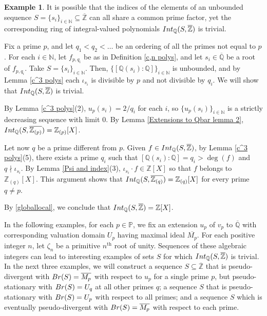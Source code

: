 \documentclass{article}
\theoremstyle{definition}\newtheorem{Def}[equation]{Definition}
\newtheorem{Ex}[equation]{Example}
\theoremstyle{definition}\newtheorem{Ques}[equation]{Question}
\theoremstyle{definition}\newtheorem{Conj}[equation]{Conjecture}
\theoremstyle{definition}\newtheorem{Not}[equation]{Notation}
\newcommand{\N}{\mathbb{N}}
\newcommand{\Q}{\mathbb{Q}}
\newcommand{\oQ}{\overline{\Q}}
\newcommand{\oZ}{\overline{\Z}}
\newcommand{\Z}{\mathbb{Z}}
\newcommand{\oMp}{\overline{M_p}}
\newcommand{\Int}{\textnormal{Int}}
\newcommand{\IntQ}{\Int_{\Q}}
\newcommand{\Br}{\textnormal{Br}}
\newcommand{\PP}{\mathbb{P}}
\numberwithin{equation}{section}
\begin{document}
\begin{Ex}\label{unbounded trivial example 1}
It is possible that the indices of the elements of an unbounded sequence $S=\{s_i\}_{i\in\N}\subseteq\oZ$ can all share a common prime factor, yet the corresponding ring of integral-valued polynomials $\IntQ(S,\oZ)$ is trivial.

Fix a prime $p$, and let $q_1 < q_2 < \ldots$ be an ordering of all the primes not equal to $p$. For each $i \in \N$, let $f_{p,q_i}$ be as in Definition \ref{c,n polys}, and let $s_i\in\oQ$ be a root of $f_{p,q_i}$. Take $S = \{s_i\}_{i \in \N}$. Then, $\{[\Q(s_i): \Q]\}_{i \in \N}$ is unbounded, and by Lemma \ref{c^3 polys} each $\iota_{s_i}$ is divisible by $p$ and not divisible by $q_i$. We will show that $\IntQ(S,\oZ)$ is trivial.

By Lemma \ref{c^3 polys}(2), $u_p(s_i)=2/q_i$ for each $i$, so $\{u_p(s_i)\}_{i \in \N}$ is a strictly decreasing sequence with limit $0$. By Lemma \ref{Extensions to Qbar lemma 2}, $\IntQ(S, \overline{\Z_{(p)}}) = \Z_{(p)}[X]$.

Let now $q$ be a prime different from $p$. Given  $f\in\IntQ(S,\oZ)$, by Lemma \ref{c^3 polys}(5), there exists a prime $q_i$ such that $[\Q(s_i):\Q]=q_i>\deg(f)$ and $q\nmid\iota_{s_i}$. By Lemma \ref{Psi and index}(3), $\iota_{s_i}\cdot f\in\Z[X]$ so that $f$ belongs to $\Z_{(q)}[X]$. This argument shows that $\IntQ(S,\overline{\Z_{(q)}})=\Z_{(q)}[X]$ for every prime $q\not=p$.

By \eqref{globallocal}, we conclude that $\IntQ(S,\oZ)=\Z[X]$.
\end{Ex}

In the following examples, for each $p\in\PP$, we fix an extension $u_p$ of $v_p$ to $\oQ$ with corresponding valuation domain $U_p$ having maximal ideal $\oMp$. For each positive integer $n$, let $\zeta_n$ be a primitive $n^\text{th}$ root of unity. Sequences of these algebraic integers can lead to interesting examples of sets $S$ for which $\IntQ(S,\oZ)$ is trivial. In the next three examples, we will construct a sequence $S\subseteq\oZ$ that is pseudo-divergent with $\Br(S)=\oMp$ with respect to $u_p$ for a single prime $p$, but pseudo-stationary with $\Br(S)=U_q$ at all other primes $q$; a sequence $S$ that is pseudo-stationary with $\Br(S)=U_p$ with respect to all primes; and a sequence $S$ which is eventually pseudo-divergent with $\Br(S)=\oMp$ with respect to each prime.
\end{document}
